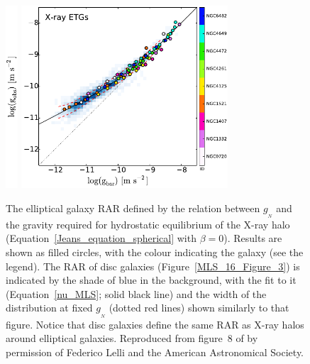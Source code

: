 \documentclass[fleqn,usenatbib,useAMS,onecolumn]{mnras} %
\begin{document}
\begin{figure}
	\centering
	\includegraphics[height=6.8cm]{Lelli_2017_Figure_8_ylabel}
	\includegraphics[height=6.8cm]{Lelli_2017_Figure_8_right}
	\caption{The elliptical galaxy RAR defined by the relation between $g_{_N}$ and the gravity required for hydrostatic equilibrium of the X-ray halo (Equation~\ref{Jeans_equation_spherical} with $\beta = 0$). Results are shown as filled circles, with the colour indicating the galaxy (see the legend). The RAR of disc galaxies (Figure~\ref{MLS_16_Figure_3}) is indicated by the shade of blue in the background, with the fit to it (Equation~\ref{nu_MLS}; solid black line) and the width of the distribution at fixed $g_{_N}$ (dotted red lines) shown similarly to that figure. Notice that disc galaxies define the same RAR as X-ray halos around elliptical galaxies. Reproduced from figure~8 of \citet{Lelli_2017} by permission of Federico Lelli and the American Astronomical Society.}
	\label{Lelli_2017_Figure_8_right}
\end{figure}
\end{document}
